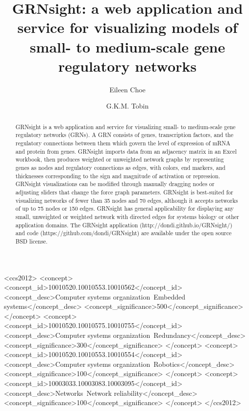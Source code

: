 \documentclass[sigconf,review,anonymous]{acmart}
\begin{document}
\title{GRNsight: a web application and service for visualizing models of small- to medium-scale gene regulatory networks}

\author{Eileen Choe}

\author{G.K.M. Tobin}

\renewcommand{\shortauthors}{B. Trovato et. al.}

\begin{abstract}

GRNsight is a web application and service for visualizing small- to medium-scale gene regulatory networks (GRNs). A GRN consists of genes, transcription factors, and the regulatory connections between them which govern the level of expression of mRNA and protein from genes. GRNsight imports data from an adjacency matrix in an Excel workbook, then produces weighted or unweighted network graphs by representing genes as nodes and regulatory connections as edges, with colors, end markers, and thicknesses corresponding to the sign and magnitude of activation or repression. GRNsight visualizations can be modified through manually dragging nodes or adjusting sliders that change the force graph parameters. GRNsight is best-suited for visualizing networks of fewer than 35 nodes and 70 edges, although it accepts networks of up to 75 nodes or 150 edges. GRNsight has general applicability for displaying any small, unweighted or weighted network with directed edges for systems biology or other application domains. The GRNsight application (http://dondi.github.io/GRNsight/) and code (https://github.com/dondi/GRNsight) are available under the open source BSD license.

\end{abstract}

%
%
\begin{CCSXML}
<ccs2012>
 <concept>
  <concept_id>10010520.10010553.10010562</concept_id>
  <concept_desc>Computer systems organization~Embedded systems</concept_desc>
  <concept_significance>500</concept_significance>
 </concept>
 <concept>
  <concept_id>10010520.10010575.10010755</concept_id>
  <concept_desc>Computer systems organization~Redundancy</concept_desc>
  <concept_significance>300</concept_significance>
 </concept>
 <concept>
  <concept_id>10010520.10010553.10010554</concept_id>
  <concept_desc>Computer systems organization~Robotics</concept_desc>
  <concept_significance>100</concept_significance>
 </concept>
 <concept>
  <concept_id>10003033.10003083.10003095</concept_id>
  <concept_desc>Networks~Network reliability</concept_desc>
  <concept_significance>100</concept_significance>
 </concept>
</ccs2012>  
\end{CCSXML}
\end{document}
